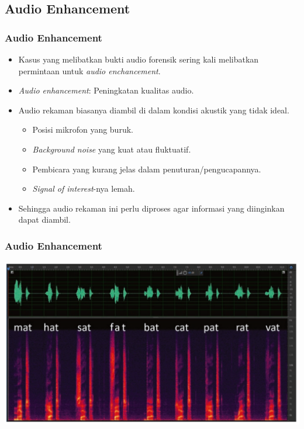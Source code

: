 \documentclass[pdflatex,compress]{beamer}
\begin{document}
\subsection{Audio Enhancement}

\begin{frame}
	\frametitle{Audio Enhancement}
	\begin{itemize}
		\item Kasus yang melibatkan bukti audio forensik sering kali melibatkan permintaan untuk \textit{audio enchancement}.
		\item \textit{Audio enhancement}: Peningkatan kualitas audio.
		\item Audio rekaman biasanya diambil di dalam kondisi akustik yang tidak ideal.
		\begin{itemize}
			\item Posisi mikrofon yang buruk.
			\item \textit{Background noise} yang kuat atau fluktuatif.
			\item Pembicara yang kurang jelas dalam penuturan/pengucapannya.
			\item \textit{Signal of interest}-nya lemah.
		\end{itemize}
		\item Sehingga audio rekaman ini perlu diproses agar informasi yang diinginkan dapat diambil.
	\end{itemize}
\end{frame}

\begin{frame}
	\frametitle{Audio Enhancement}
	
	\begin{center}
		\includegraphics[width=0.8\linewidth]{img/img004}
	\end{center}
	
\end{frame}
\end{document}
